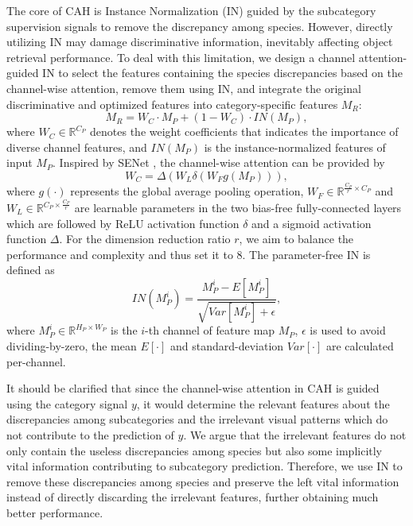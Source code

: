\documentclass[letterpaper]{article} %
\begin{document}
The core of CAH is Instance Normalization (IN) \cite{DBLP:conf/eccv/PanLST18} guided by the subcategory supervision signals to remove the discrepancy among species. However, directly utilizing IN may damage discriminative information, inevitably affecting object retrieval performance. To deal with this limitation, we design a channel attention-guided IN to select the features containing the species discrepancies based on the channel-wise attention, remove them using IN, and integrate the original discriminative and optimized features into category-specific features $M_R$:
\begin{equation}
M_R = W_C \cdot M_P + (1-W_C) \cdot IN(M_P),
\end{equation}
where $ W_C \in \mathbb{R}^{C_P} $ denotes the weight coefficients that indicates the importance of diverse channel features, and $ IN(M_P) $ is the instance-normalized features of input $ M_P $.
Inspired by SENet \cite{DBLP:conf/cvpr/HuSS18}, the channel-wise attention can be provided by 
\begin{equation}
W_C = \Delta(W_L \delta(W_F g(M_P))),
\end{equation}
where $ g(\cdot) $ represents the global average pooling operation, $ W_F \in \mathbb{R}^{\frac{C_P}{r}\times C_P}$ and $ W_L \in \mathbb{R} ^{C_P \times \frac{C_P}{r}} $ are learnable parameters in the two bias-free fully-connected layers which are followed by ReLU activation function $ \delta $ and a sigmoid activation function $ \Delta $. For the dimension reduction ratio $ r $, we aim to balance the performance and complexity and thus set it to 8.
The parameter-free IN is defined as 
\begin{equation}
IN(M_P^i) = \frac{M_P^i - E[M_P^i]}{\sqrt{Var[M_P^i]+\epsilon}},
\end{equation}
where $ M_P^i \in \mathbb{R}^{H_P \times W_P}$ is the $ i $-th channel of feature map $ M_P $, $ \epsilon $ is used to avoid dividing-by-zero, the mean $ E[\cdot] $ and standard-deviation $ Var[\cdot] $ are calculated per-channel. 


It should be clarified that since the channel-wise attention in CAH is guided using the category signal $y$, it would determine the relevant features about the discrepancies among subcategories and the irrelevant visual patterns which do not contribute to the prediction of $y$. We argue that the irrelevant features do not only contain the useless discrepancies among species but also some implicitly vital information contributing to subcategory prediction. Therefore, we use IN to remove these discrepancies among species and preserve the left vital information instead of directly discarding the irrelevant features, further obtaining much better performance.
\end{document}
